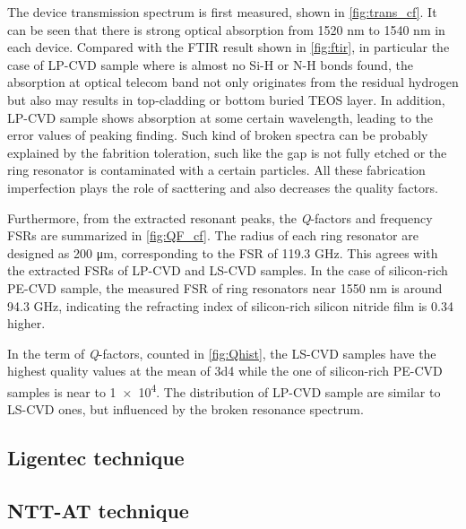 The device transmission spectrum is first measured, shown in \autoref{fig:trans_cf}. It can be seen that there is strong optical absorption from 1520 nm to 1540 nm in each device. Compared with the FTIR result shown in \autoref{fig:ftir}, in particular the case of LP-CVD sample where is almost no Si-H or N-H bonds found, the absorption at optical telecom band not only originates from the residual hydrogen but also may results in top-cladding or bottom buried TEOS layer.
In addition, LP-CVD sample shows absorption at some certain wavelength, leading to the error values of peaking finding. Such kind of broken spectra can be probably explained by the fabrition toleration, such like the gap is not fully etched or the ring resonator is contaminated with a certain particles. All these fabrication imperfection plays the role of sacttering and also decreases the quality factors.

Furthermore, from the extracted resonant peaks, the \textit{Q}-factors and frequency FSRs are summarized in \autoref{fig:QF_cf}. The radius of each ring resonator are designed as 200 \si{\um}, corresponding to the FSR of 119.3 GHz. This agrees with the extracted FSRs of LP-CVD and LS-CVD samples. In the case of silicon-rich PE-CVD sample, the measured FSR of ring resonators near 1550 nm is around 94.3 GHz, indicating the refracting index of silicon-rich silicon nitride film is 0.34 higher.

In the term of \textit{Q}-factors, counted in \autoref{fig:Qhist}, the LS-CVD samples have the highest quality values at the mean of \num{3d4} while the one of silicon-rich PE-CVD samples is near to \num{1e4}. The distribution of LP-CVD sample are similar to LS-CVD ones, but influenced by the broken resonance spectrum.

\begin{figure}
	\centering
	
	\label{fig:trans_cf}
\end{figure}

\begin{figure}
	\centering
	
	\label{fig:QF_cf}
\end{figure}

\begin{figure}
	\centering
	
	\label{fig:Qhist}
\end{figure}


\subsection{Ligentec technique}


\subsection{NTT-AT technique}